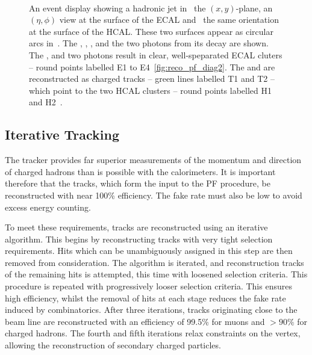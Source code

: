 \begin{figure}[h!]
\centering
{}\\
\quad
{}
\caption[]{An event display showing a hadronic jet in~
  the $(x,y)$-plane,  an $(\eta,\phi)$ view at the
  surface of the \ac{ECAL} and~ the same orientation
  at the surface of the \ac{HCAL}. These two surfaces appear as circular arcs
  in~. The \PKlong, \Ppiminus, \Ppiplus, \Ppizero and
  the two photons from its decay are shown. The \PKlong, \Ppiminus and two photons
  result in clear, well-speparated \ac{ECAL} cluters -- round points labelled E1
  to E4~\ref{fig:reco_pf_diag2}. The \Ppiplus and \Ppiminus are reconstructed as
  charged tracks -- green lines labelled T1 and T2 -- which point to the two
  \ac{HCAL} clusters -- round points labelled H1 and H2~\cite{cms_pf_pas}.}
\label{fig:reco_pf_diag}
\end{figure}

\subsection{Iterative Tracking}
The tracker provides far superior measurements of the momentum and direction of
charged hadrons than is possible with the calorimeters. It is important
therefore that the tracks, which form the input to the \ac{PF} procedure, be
reconstructed with near 100\% efficiency. The fake rate must also be low to
avoid excess energy counting.

To meet these requirements, tracks are reconstructed using an iterative
algorithm. This begins by reconstructing tracks with very tight selection
requirements. Hits which can be unambiguously assigned in this step are then
removed from consideration. The algorithm is iterated, and reconstruction tracks
of the remaining hits is attempted, this time with loosened selection
criteria. This procedure is repeated with progressively looser selection
criteria. This ensures high efficiency, whilst the removal of hits at each stage
reduces the fake rate induced by combinatorics.  After three iterations, tracks
originating close to the beam line are reconstructed with an efficiency of
99.5\% for muons and $>90\%$ for charged hadrons. The fourth and fifth
iterations relax constraints on the vertex, allowing the reconstruction of
secondary charged particles.

